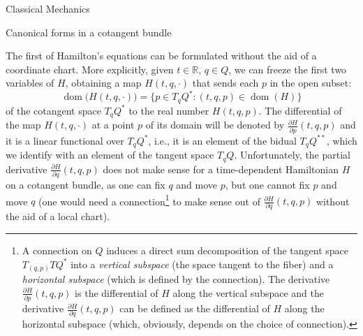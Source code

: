 \documentclass[oneside,a4paper,11pt]{amsbook}
\newcommand{\R}{\mathds R}
\DeclareMathOperator{\Dom}{dom}
\theoremstyle{remark}\newtheorem{exercise}{Exercise}[chapter]
\theoremstyle{plain}\newtheorem{teo}{Theorem}[section]
\theoremstyle{plain}\newtheorem{lem}[teo]{Lemma}
\theoremstyle{plain}\newtheorem{prop}[teo]{Proposition}
\theoremstyle{plain}\newtheorem{cor}[teo]{Corollary}
\theoremstyle{definition}\newtheorem{defin}[teo]{Definition}
\theoremstyle{remark}\newtheorem{rem}[teo]{Remark}
\theoremstyle{definition}\newtheorem{notation}[teo]{Notation}
\theoremstyle{definition}\newtheorem{convention}[teo]{Convention}
\theoremstyle{definition}\newtheorem{example}[teo]{Example}
\numberwithin{section}{chapter}
\numberwithin{equation}{section}
\begin{document}
\begin{chapter}{Classical Mechanics}
\begin{section}{Canonical forms in a cotangent bundle}
\medskip

The first of Hamilton's equations can be formulated without the aid of a coordinate chart. More explicitly, given $t\in\R$, $q\in Q$, we can freeze
the first two variables of $H$, obtaining a map $H(t,q,\cdot)$ that sends each $p$ in the open subset:
\[\Dom\!\big(H(t,q,\cdot)\big)=\big\{p\in T_qQ^*:(t,q,p)\in\Dom(H)\big\}\]
of the cotangent space $T_qQ^*$ to the real number $H(t,q,p)$. The differential of the map $H(t,q,\cdot)$ at a point $p$ of its domain will be denoted
by $\frac{\partial H}{\partial p}(t,q,p)$ and it is a linear functional over $T_qQ^*$, i.e., it is an element of the bidual $T_qQ^{**}$, which we identify
with an element of the tangent space $T_qQ$. Unfortunately, the partial derivative $\frac{\partial H}{\partial q}(t,q,p)$
does not make sense for a time-dependent Hamiltonian $H$ on a cotangent bundle, as one can fix $q$ and move $p$, but one cannot fix $p$ and move $q$
(one would need a connection\footnote{%
A connection on $Q$ induces a direct sum decomposition of the tangent space $T_{(q,p)}TQ^*$ into a {\em vertical subspace\/}
(the space tangent to the fiber) and a {\em horizontal subspace\/} (which is defined by the connection). The derivative
$\frac{\partial H}{\partial p}(t,q,p)$ is the differential of $H$ along the vertical subspace and the derivative
$\frac{\partial H}{\partial q}(t,q,p)$ can be defined as the differential of $H$ along the horizontal subspace (which, obviously,
depends on the choice of connection).} to make sense out of $\frac{\partial H}{\partial q}(t,q,p)$ without
the aid of a local chart).


\end{section}
\end{chapter}
\end{document}
